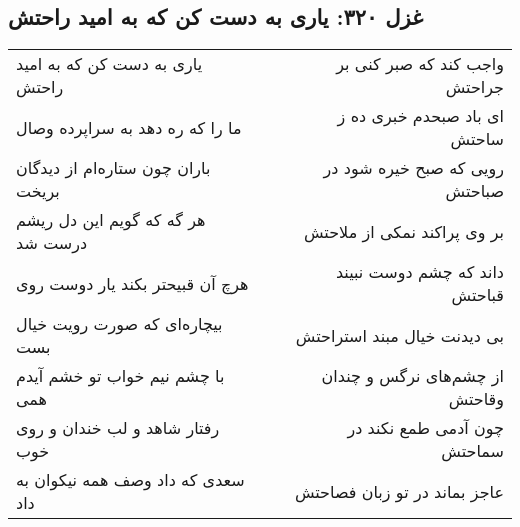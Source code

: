 \begin{center}
\section*{غزل ۳۲۰: یاری به دست کن که به امید راحتش}
\label{sec:320}
\begin{longtable}{l p{0.5cm} r}
یاری به دست کن که به امید راحتش
&&
واجب کند که صبر کنی بر جراحتش
\\
ما را که ره دهد به سراپرده وصال
&&
ای باد صبحدم خبری ده ز ساحتش
\\
باران چون ستاره‌ام از دیدگان بریخت
&&
رویی که صبح خیره شود در صباحتش
\\
هر گه که گویم این دل ریشم درست شد
&&
بر وی پراکند نمکی از ملاحتش
\\
هرچ آن قبیحتر بکند یار دوست روی
&&
داند که چشم دوست نبیند قباحتش
\\
بیچاره‌ای که صورت رویت خیال بست
&&
بی دیدنت خیال مبند استراحتش
\\
با چشم نیم خواب تو خشم آیدم همی
&&
از چشم‌های نرگس و چندان وقاحتش
\\
رفتار شاهد و لب خندان و روی خوب
&&
چون آدمی طمع نکند در سماحتش
\\
سعدی که داد وصف همه نیکوان به داد
&&
عاجز بماند در تو زبان فصاحتش
\\
\end{longtable}
\end{center}
